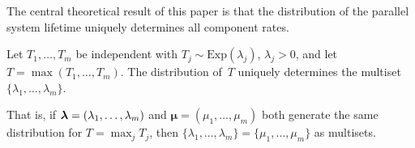 The central theoretical result of this paper is that the distribution of
the parallel system lifetime uniquely determines all component rates.

\begin{theorem}
\label{thm:identifiability}
  Let $T_1, \ldots, T_m$ be independent with $T_j \sim \mathrm{Exp}(\lambda_j)$,
  $\lambda_j > 0$, and let $T = \max(T_1, \ldots, T_m)$.  The distribution
  of~$T$ uniquely determines the multiset $\{\lambda_1, \ldots, \lambda_m\}$.

  That is, if $\boldsymbol{\lambda} = (\lambda_1, \ldots, \lambda_m)$ and
  $\boldsymbol{\mu} = (\mu_1, \ldots, \mu_m)$ both generate the same
  distribution for $T = \max_j T_j$, then
  $\{\lambda_1, \ldots, \lambda_m\} = \{\mu_1, \ldots, \mu_m\}$ as
  multisets.
\end{theorem}

